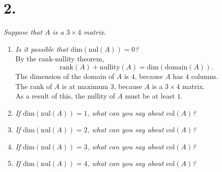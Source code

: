 \documentclass[12pt]{article}
\begin{document}
\section*{2.}
\textit{Suppose that $A$ is a $3 \times 4$ matrix.}
\begin{enumerate}[label=(\alph*)]
	\item \textit{Is it possible that $\text{dim}(\text{nul}(A)) = 0$?}
	\\[\baselineskip]
	 By the rank-nullity theorem,
	\begin{equation*}
		\text{rank}(A) + \text{nullity}(A) = \text{dim}(\text{domain}(A))
		.
	\end{equation*}
	The dimension of the domain of $A$ is $4$, because $A$ has $4$ columns. \\
	The rank of $A$ is at maximum 3, because $A$ is a $3 \times 4$ matrix. \\
	As a result of this, the nullity of $A$ must be at least $1$.
	
	\item \textit{If $\text{dim}(\text{nul}(A)) = 1$, what can you say about
	$\text{col}(A)$?} \\[\baselineskip]

	\item \textit{If $\text{dim}(\text{nul}(A)) = 2$, what can you say about
	$\text{col}(A)$?} \\[\baselineskip]
	
	\item \textit{If $\text{dim}(\text{nul}(A)) = 3$, what can you say about
	$\text{col}(A)$?} \\[\baselineskip]
	
	\item \textit{If $\text{dim}(\text{nul}(A)) = 4$, what can you say about
	$\text{col}(A)$?} \\[\baselineskip]
\end{enumerate}
\newpage
\end{document}
